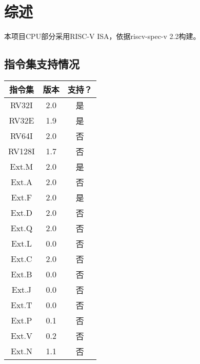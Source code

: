 %
% 
% 
% 
% 
% 
% 
%

\chapter{综述}
本项目CPU部分采用RISC-V ISA，依据riscv-spec-v 2.2构建。
\section{指令集支持情况}
\begin{tabular}{|c|c|c|}
    \hline
    指令集  &   版本    &   支持？\\\hline
    RV32I   &   2.0 &   是\\\hline
    RV32E   &   1.9 &   是\\\hline
    RV64I   &   2.0 &   否\\\hline
    RV128I  &   1.7 &   否\\\hline
    Ext.M   &   2.0 &   是\\\hline
    Ext.A   &   2.0 &   否\\\hline
    Ext.F   &   2.0 &   是\\\hline
    Ext.D   &   2.0 &   否\\\hline
    Ext.Q   &   2.0 &   否\\\hline
    Ext.L   &   0.0 &   否\\\hline
    Ext.C   &   2.0 &   否\\\hline
    Ext.B   &   0.0 &   否\\\hline
    Ext.J   &   0.0 &   否\\\hline
    Ext.T   &   0.0 &   否\\\hline
    Ext.P   &   0.1 &   否\\\hline
    Ext.V   &   0.2 &   否\\\hline
    Ext.N   &   1.1 &   否\\\hline
\end{tabular}

